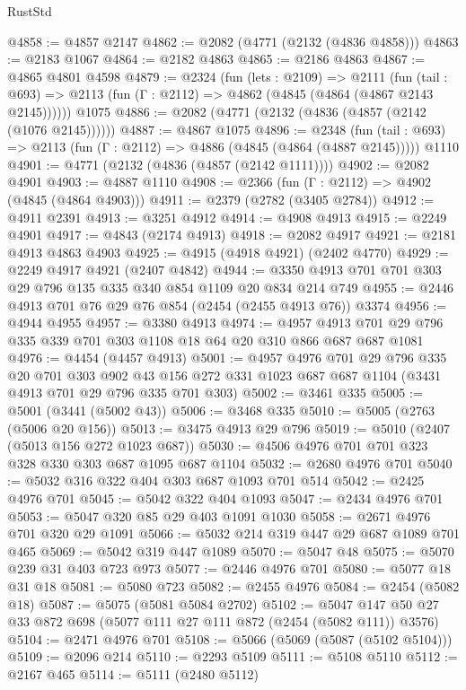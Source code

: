\begin{lexlean}{RustStd}
\begin{coremodule}
@4858 := @4857 @2147
@4862 := @2082 (@4771 (@2132 (@4836 @4858)))
@4863 := @2183 @1067
@4864 := @2182 @4863
@4865 := @2186 @4863
@4867 := @4865 @4801 @4598
@4879 := @2324
    (fun (lets : @2109) =>
    @2111
      (fun (tail : @693) => @2113 (fun (Γ : @2112) => @4862 (@4845 (@4864 (@4867 @2143 @2145))))))
    @1075
@4886 := @2082 (@4771 (@2132 (@4836 (@4857 (@2142 (@1076 @2145))))))
@4887 := @4867 @1075
@4896 := @2348
    (fun (tail : @693) => @2113 (fun (Γ : @2112) => @4886 (@4845 (@4864 (@4887 @2145)))))
    @1110
@4901 := @4771 (@2132 (@4836 (@4857 (@2142 @1111))))
@4902 := @2082 @4901
@4903 := @4887 @1110
@4908 := @2366 (fun (Γ : @2112) => @4902 (@4845 (@4864 @4903)))
@4911 := @2379 (@2782 (@3405 @2784))
@4912 := @4911 @2391
@4913 := @3251 @4912
@4914 := @4908 @4913
@4915 := @2249 @4901
@4917 := @4843 (@2174 @4913)
@4918 := @2082 @4917
@4921 := @2181 @4913 @4863 @4903
@4925 := @4915 (@4918 @4921) (@2402 @4770)
@4929 := @2249 @4917 @4921 (@2407 @4842)
@4944 := @3350 @4913 @701 @701 @303 @29 @796 @135 @335 @340 @854 @1109 @20 @834 @214 @749
@4955 := @2446 @4913 @701 @76 @29 @76 @854 (@2454 (@2455 @4913 @76)) @3374
@4956 := @4944 @4955
@4957 := @3380 @4913
@4974 := @4957 @4913 @701 @29 @796 @335 @339 @701 @303 @1108 @18 @64 @20 @310 @866 @687 @687 @1081
@4976 := @4454 (@4457 @4913)
@5001 := @4957
    @4976
    @701
    @29
    @796
    @335
    @20
    @701
    @303
    @902
    @43
    @156
    @272
    @331
    @1023
    @687
    @687
    @1104
    (@3431 @4913 @701 @29 @796 @335 @701 @303)
@5002 := @3461 @335
@5005 := @5001 (@3441 (@5002 @43))
@5006 := @3468 @335
@5010 := @5005 (@2763 (@5006 @20 @156))
@5013 := @3475 @4913 @29 @796
@5019 := @5010 (@2407 (@5013 @156 @272 @1023 @687))
@5030 := @4506 @4976 @701 @701 @323 @328 @330 @303 @687 @1095 @687 @1104
@5032 := @2680 @4976 @701
@5040 := @5032 @316 @322 @404 @303 @687 @1093 @701 @514
@5042 := @2425 @4976 @701
@5045 := @5042 @322 @404 @1093
@5047 := @2434 @4976 @701
@5053 := @5047 @320 @85 @29 @403 @1091 @1030
@5058 := @2671 @4976 @701 @320 @29 @1091
@5066 := @5032 @214 @319 @447 @29 @687 @1089 @701 @465
@5069 := @5042 @319 @447 @1089
@5070 := @5047 @48
@5075 := @5070 @239 @31 @403 @723 @973
@5077 := @2446 @4976 @701
@5080 := @5077 @18 @31 @18
@5081 := @5080 @723
@5082 := @2455 @4976
@5084 := @2454 (@5082 @18)
@5087 := @5075 (@5081 @5084 @2702)
@5102 := @5047 @147 @50 @27 @33 @872 @698 (@5077 @111 @27 @111 @872 (@2454 (@5082 @111)) @3576)
@5104 := @2471 @4976 @701
@5108 := @5066 (@5069 (@5087 (@5102 @5104)))
@5109 := @2096 @214
@5110 := @2293 @5109
@5111 := @5108 @5110
@5112 := @2167 @465
@5114 := @5111 (@2480 @5112)

\end{coremodule}
\end{lexlean}
